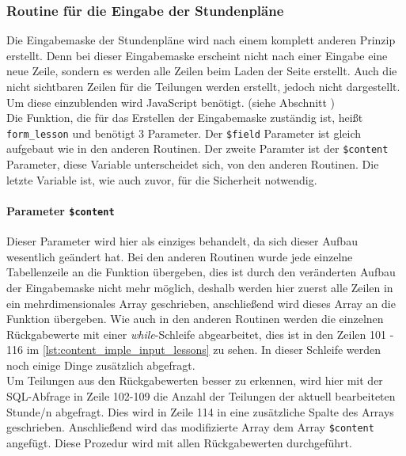 \subsubsection{Routine für die Eingabe der Stundenpläne}
Die Eingabemaske der Stundenpläne wird nach einem komplett anderen Prinzip erstellt. Denn bei dieser Eingabemaske erscheint nicht nach einer Eingabe eine neue Zeile, sondern es werden alle Zeilen beim Laden der Seite erstellt. Auch die nicht sichtbaren Zeilen für die Teilungen werden erstellt, jedoch nicht dargestellt. Um diese einzublenden wird JavaScript benötigt. (siehe Abschnitt )\\
Die Funktion, die für das Erstellen der Eingabemaske zuständig ist, heißt \texttt{form\_lesson} und benötigt 3 Parameter. Der \texttt{\$field} Parameter ist gleich aufgebaut wie in den anderen Routinen. Der zweite Paramter ist der \texttt{\$content} Parameter, diese Variable unterscheidet sich, von den anderen Routinen. Die letzte Variable ist, wie auch zuvor, für die Sicherheit notwendig.
\paragraph{Parameter \texttt{\$content}\\}
Dieser Parameter wird hier als einziges behandelt, da sich dieser Aufbau wesentlich geändert hat. Bei den anderen Routinen wurde jede einzelne Tabellenzeile an die Funktion übergeben, dies ist durch den veränderten Aufbau der Eingabemaske nicht mehr möglich, deshalb werden hier zuerst alle Zeilen in ein mehrdimensionales Array geschrieben, anschließend wird dieses Array an die Funktion übergeben. Wie auch in den anderen Routinen werden die einzelnen Rückgabewerte mit einer \textit{while}-Schleife abgearbeitet, dies ist in den Zeilen 101 - 116 im \autoref{lst:content_imple_input_lessons} zu sehen. In dieser Schleife werden noch einige Dinge zusätzlich abgefragt.\\
Um Teilungen aus den Rückgabewerten besser zu erkennen, wird hier mit der SQL-Abfrage in Zeile 102-109 die Anzahl der Teilungen der aktuell bearbeiteten Stunde/n abgefragt. Dies wird in Zeile 114 in eine zusätzliche Spalte des Arrays geschrieben. Anschließend wird das modifizierte Array dem Array \texttt{\$content} angefügt. Diese Prozedur wird mit allen Rückgabewerten durchgeführt.\\

